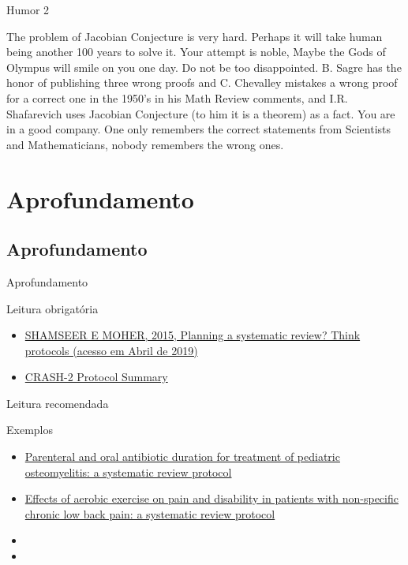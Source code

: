 \documentclass{beamer}
\begin{document}
\begin{frame}{Humor 2}
  \begin{block}{}
    \footnotesize
    The problem of Jacobian Conjecture is very hard. Perhaps it will
    take human being another 100 years to solve it. \alert{Your
      attempt is noble, Maybe the Gods of Olympus will smile on you
      one day.} Do not be too disappointed. B. Sagre has the honor of
    publishing three wrong proofs and C. Chevalley mistakes a wrong
    proof for a correct one in the 1950’s in his Math Review comments,
    and I.R. Shafarevich uses Jacobian Conjecture (to him it is a
    theorem) as a fact. You are in a good company. One only remembers
    the correct statements from Scientists and Mathematicians, nobody
    remembers the wrong ones.
  \end{block}
\end{frame}

\section{Aprofundamento}

\subsection{Aprofundamento}

\begin{frame}{Aprofundamento}
  \begin{block}{Leitura obrigatória}
    \scriptsize
    \begin{itemize}
    \item \href{http://blogs.biomedcentral.com/bmcblog/2015/01/05/planning-a-systematic-review-think-protocols/}
    {SHAMSEER E MOHER, 2015, Planning a systematic review? Think protocols (acesso em Abril de 2019)}
  \item \href{http://www.crash2.lshtm.ac.uk/SummaryEng.htm}{CRASH-2 Protocol Summary}
    \end{itemize}
  \end{block}
  \begin{block}{Leitura recomendada}
    \begin{exampleblock}{\tiny Exemplos}
      \begin{itemize}
        \tiny
      \item \href{https://doi.org/10.1186/2046-4053-2-92}
        {Parenteral and oral antibiotic duration for treatment of pediatric osteomyelitis: a systematic review protocol}
      \item \href{https://doi.org/10.1186/s13643-019-1019-3}
        {Effects of aerobic exercise on pain and disability in patients with non-specific chronic low back pain: a systematic review protocol}
      \end{itemize}
    \end{exampleblock}
    \begin{itemize}
      \tiny
    \item 
    \item 
  \end{itemize}

  \end{block}
\end{frame}
\end{document}

